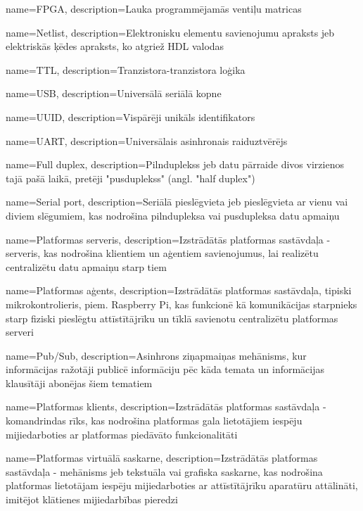 \makeglossaries

{
    name=FPGA,
    description={Lauka programmējamās ventiļu matricas}
}

{
    name=Netlist,
    description={Elektronisku elementu savienojumu apraksts jeb elektriskās ķēdes apraksts, ko atgriež HDL valodas}
}

{
    name=TTL,
    description={Tranzistora-tranzistora loģika}
}

{
    name=USB,
    description={Universālā seriālā kopne}
}

{
    name=UUID,
    description={Vispārēji unikāls identifikators}
}

{
    name=UART,
    description={Universālais asinhronais raiduztvērējs}
}

{
    name=Full duplex,
    description={Pilnduplekss jeb datu pārraide divos virzienos tajā pašā laikā, pretēji "pusduplekss" (angl. "half duplex")}
}

{
    name=Serial port,
    description={Seriālā pieslēgvieta jeb pieslēgvieta ar vienu vai diviem slēgumiem, kas nodrošina pilndupleksa 
        vai pusdupleksa datu apmaiņu}
}

{
    name=Platformas serveris,
    description={Izstrādātās platformas sastāvdaļa - serveris, kas nodrošina klientiem un aģentiem savienojumus, 
        lai realizētu centralizētu datu apmaiņu starp tiem}
}

{
    name=Platformas aģents,
    description={Izstrādātās platformas sastāvdaļa, tipiski mikrokontrolieris, piem. Raspberry Pi, kas 
        funkcionē kā komunikācijas starpnieks starp fiziski pieslēgtu attīstītājrīku un tīklā 
        savienotu centralizētu platformas serveri}
}

{
    name=Pub/Sub,
    description={Asinhrons ziņapmaiņas mehānisms, kur informācijas ražotāji publicē informāciju pēc kāda temata 
        un informācijas klausītāji abonējas šiem tematiem}
}

{
    name=Platformas klients,
    description={Izstrādātās platformas sastāvdaļa - komandrindas rīks, kas nodrošina platformas gala lietotājiem
        iespēju mijiedarboties ar platformas piedāvāto funkcionalitāti}
}

{
    name=Platformas virtuālā saskarne,
    description={Izstrādātās platformas sastāvdaļa - mehānisms jeb tekstuāla vai grafiska saskarne, kas nodrošina 
        platformas lietotājam iespēju mijiedarboties ar attīstītājrīku aparatūru attālināti, imitējot klātienes 
        mijiedarbības pieredzi}
}

